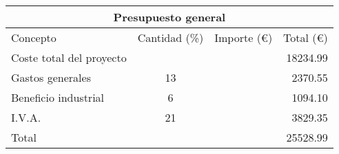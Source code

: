\begin{table}[!htb]
\centering
\begin{tabular}{lcrr}
\toprule
\multicolumn{4}{c}{Presupuesto general}\\
\midrule
Concepto & Cantidad (\%) & Importe (\euro) & Total (\euro)\\
\midrule
Coste total del proyecto & & & 18234.99\\
Gastos generales & 13 & & 2370.55\\
Beneficio industrial & 6 & & 1094.10\\
I.V.A. & 21 & & 3829.35\\
\bottomrule
Total & & & 25528.99\\
\bottomrule
\end{tabular}
\label{presupuestogeneral}
\end{table}
